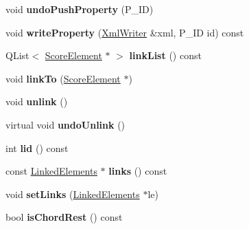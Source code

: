 \begin{DoxyCompactItemize}
void {\bfseries undo\+Push\+Property} (P\+\_\+\+ID)
\item 
\mbox{\label{class_ms_1_1_score_element_a27407fb370f41b2107013e918ffb00fa}} 
void {\bfseries write\+Property} (\hyperlink{class_ms_1_1_xml_writer}{Xml\+Writer} \&xml, P\+\_\+\+ID id) const
\item 
\mbox{\label{class_ms_1_1_score_element_a2f0ed55c566c19cb483d77250cb52450}} 
Q\+List$<$ \hyperlink{class_ms_1_1_score_element}{Score\+Element} $\ast$ $>$ {\bfseries link\+List} () const
\item 
\mbox{\label{class_ms_1_1_score_element_a1dad93f0591eb31f69854e8f141b051e}} 
void {\bfseries link\+To} (\hyperlink{class_ms_1_1_score_element}{Score\+Element} $\ast$)
\item 
\mbox{\label{class_ms_1_1_score_element_a1d76afaf3ee463445961c3d981901be1}} 
void {\bfseries unlink} ()
\item 
\mbox{\label{class_ms_1_1_score_element_a994f2abd8df02a160c7055b0cae26c87}} 
virtual void {\bfseries undo\+Unlink} ()
\item 
\mbox{\label{class_ms_1_1_score_element_ad9b69df1d2c04f2b298520bb649a8c55}} 
int {\bfseries lid} () const
\item 
\mbox{\label{class_ms_1_1_score_element_a38f371d2c830610ab93e74c813d55e07}} 
const \hyperlink{class_ms_1_1_linked_elements}{Linked\+Elements} $\ast$ {\bfseries links} () const
\item 
\mbox{\label{class_ms_1_1_score_element_ae1e16c1a83100a1ea23b05bfb1642283}} 
void {\bfseries set\+Links} (\hyperlink{class_ms_1_1_linked_elements}{Linked\+Elements} $\ast$le)
\item 
\mbox{\label{class_ms_1_1_score_element_accef1c91df491a43c54e70474deea60c}} 
bool {\bfseries is\+Chord\+Rest} () const
\item 
\mbox{\label{class_ms_1_1_score_element_a203290a59b13861b957d2943f65a4cf0}} 

\end{DoxyCompactItemize}
